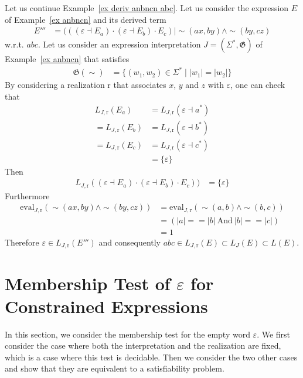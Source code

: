 \documentclass[a4paper]{llncs}
\begin{document}
  \begin{example}
Let us continue Example~\ref{ex deriv anbncn abc}.
    Let us consider the expression $E$ of Example~\ref{ex anbncn} and its derived term 
    \begin{align*}
    E'''&=(((\varepsilon\dashv E_a)\cdot (\varepsilon\dashv E_b) \cdot E_c)\mid \sim(ax,by)\wedge \sim (by,cz)
    \end{align*}
    w.r.t. $abc$.    
      Let us consider an expression interpretation $J=(\Sigma^*,\mathfrak{G})$ of Example~\ref{ex anbncn} that satisfies
      \begin{align*}
        \mathfrak{G}(\sim)&=\{(w_1,w_2)\in\Sigma^*\mid |w_1|=|w_2|\}
      \end{align*}
      By considering a realization $\mathrm{r}$ that associates $x$, $y$ and $z$ with $\varepsilon$, one can check that
      \begin{align*}
        L_{J,\mathrm{r}}(E_a) &= L_{J,\mathrm{r}}(\varepsilon \dashv a^*)\\
        = L_{J,\mathrm{r}}(E_b) &= L_{J,\mathrm{r}}(\varepsilon \dashv b^*)\\
        = L_{J,\mathrm{r}}(E_c) &= L_{J,\mathrm{r}}(\varepsilon \dashv c^*)\\
        &=\{\varepsilon\}
      \end{align*}
      Then
      \begin{align*}
        L_{J,\mathrm{r}}((\varepsilon\dashv E_a)\cdot (\varepsilon\dashv E_b) \cdot E_c)) &= \{\varepsilon\}
      \end{align*}  
       Furthermore
      \begin{align*}
        \mathrm{eval}_{J,\mathrm{r}}(\sim(ax,by)\wedge \sim (by,cz))&= \mathrm{eval}_{J,\mathrm{r}}(\sim(a,b)\wedge \sim (b,c))\\
        &= (|a|==|b| \ \mathrm{ And }\ |b|==|c|)\\
        &= 1
      \end{align*} 
      Therefore $\varepsilon\in L_{J,\mathrm{r}}(E''')$ and consequently $abc\in L_{J,\mathrm{r}}(E)\subset L_{J}(E)\subset L(E)$.       
  \end{example}
  
  \section{Membership Test of $\varepsilon$ for Constrained Expressions}\label{sec:eps membership test}
  
  In this section, we consider the membership test for the empty word $\varepsilon$. We first consider the case where both the interpretation and the realization are fixed, which is a case where this test is decidable. Then we consider the two other cases and show that they are equivalent to a satisfiability problem.
  
\end{document}
